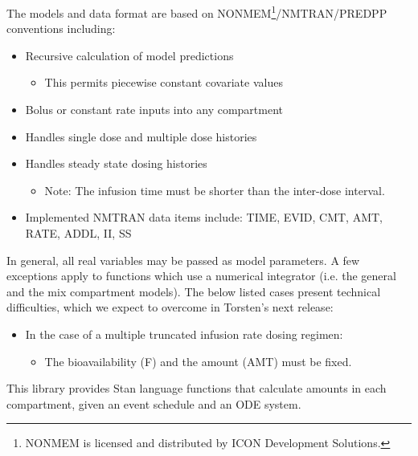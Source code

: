 \documentclass[11pt, reqno, oneside]{amsbook}
\numberwithin{equation}{chapter}
\numberwithin{figure}{chapter}
\numberwithin{table}{chapter}
\theoremstyle{remark}
\begin{document}
The models and data format are based on
NONMEM\textregistered{}\footnote{NONMEM\textregistered{} is licensed and distributed by ICON Development Solutions.}/NMTRAN/PREDPP
conventions including:
\begin{itemize}
\item Recursive calculation of model predictions
\begin{itemize}
\item This permits piecewise constant covariate values
\end{itemize}
\item Bolus or constant rate inputs into any compartment
\item Handles single dose and multiple dose histories
\item Handles steady state dosing histories
\begin{itemize}
\item Note: The infusion time must be shorter than the inter-dose interval.
\end{itemize}
\item Implemented NMTRAN data items include: TIME, EVID, CMT, AMT, RATE, ADDL, II, SS
\end{itemize}

In general, all real variables may be passed as model parameters. A
few exceptions apply to functions which use a numerical
integrator (i.e. the general and the mix compartment
models). The below listed cases present technical difficulties, which we expect to
overcome in Torsten's next release:
\begin{itemize}
\item In the case of a multiple truncated infusion rate dosing regimen:
\begin{itemize}
\item The bioavailability (F) and the amount (AMT) must be fixed.
\end{itemize}
\end{itemize}

This library provides Stan language functions that calculate amounts
in each compartment, given an event schedule and an ODE system.
\end{document}
